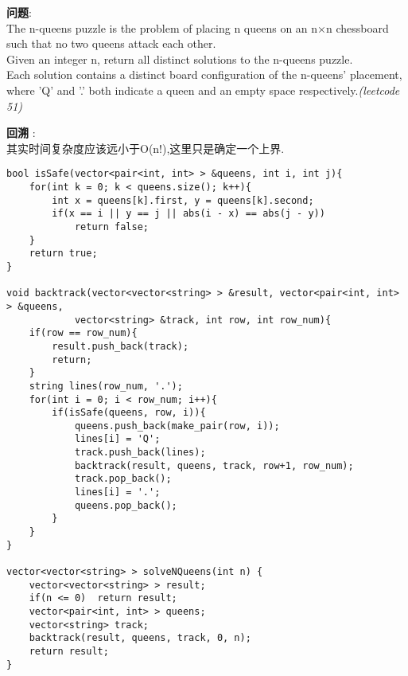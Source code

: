     
\begin{description}
    \item{\textbf{问题}}:\\
The n-queens puzzle is the problem of placing n queens on an n×n chessboard such that no two queens attack each other.\\
Given an integer n, return all distinct solutions to the n-queens puzzle.\\
Each solution contains a distinct board configuration of the n-queens' placement, where 'Q' and '.' both indicate a queen and an empty space respectively.\textit{(leetcode 51)}
    \item{\textbf{回溯}} : 
    \\其实时间复杂度应该远小于O(n!),这里只是确定一个上界.
    \begin{lstlisting}
bool isSafe(vector<pair<int, int> > &queens, int i, int j){
	for(int k = 0; k < queens.size(); k++){
		int x = queens[k].first, y = queens[k].second;
		if(x == i || y == j || abs(i - x) == abs(j - y))
			return false;
	}
	return true;
}

void backtrack(vector<vector<string> > &result, vector<pair<int, int> > &queens,
			vector<string> &track, int row, int row_num){
	if(row == row_num){
		result.push_back(track);
		return;
	}
	string lines(row_num, '.');
	for(int i = 0; i < row_num; i++){
		if(isSafe(queens, row, i)){
			queens.push_back(make_pair(row, i));
			lines[i] = 'Q';
			track.push_back(lines);
			backtrack(result, queens, track, row+1, row_num);
			track.pop_back();
			lines[i] = '.';
			queens.pop_back();
		}
	}
}

vector<vector<string> > solveNQueens(int n) {
	vector<vector<string> > result;
	if(n <= 0)	return result;
	vector<pair<int, int> > queens;
	vector<string> track;
	backtrack(result, queens, track, 0, n);
	return result;
}
    \end{lstlisting}
\end{description}
